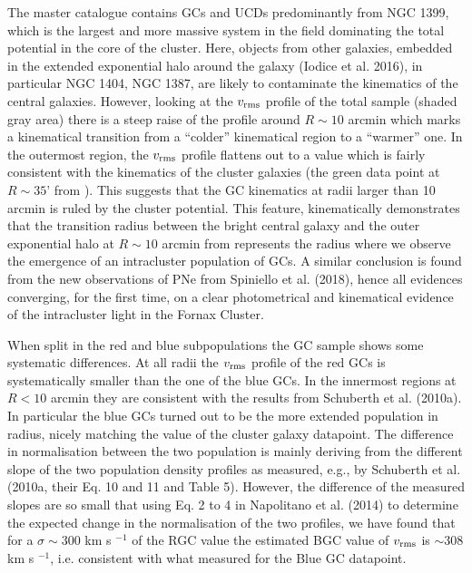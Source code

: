 \documentclass[useAMS,usenatbib]{mn2e}
\begin{document}
The master catalogue contains GCs and UCDs predominantly from NGC 1399, which is the largest and more massive system in the field dominating the total potential in the core of the cluster. Here, objects from other galaxies, embedded in the extended exponential halo around the galaxy (Iodice et al. 2016), in particular NGC 1404, NGC 1387, are likely to contaminate the kinematics of the central galaxies. However, looking at the $v_{\rm rms}$ profile of the total sample (shaded gray area) there is a steep raise of the profile around $R\sim10$ arcmin which marks a kinematical transition from a ``colder'' kinematical region to a ``warmer'' one. In the outermost region, the $v_{\rm rms}$ profile flattens out to a value which is fairly consistent with the kinematics of the cluster galaxies (the green data point at $R\sim35’$ from \citealt{Drinkwater00}). This suggests that the GC kinematics at radii larger than 10 arcmin is ruled by the cluster potential. This feature, kinematically demonstrates that the transition radius between the bright central galaxy and the outer exponential halo at $R\sim10$ arcmin from \citet{Iodice16} represents the radius where we observe the emergence of an intracluster population of GCs. A similar conclusion is found from the new observations of PNe from Spiniello et al. (2018), hence all evidences converging, for the first time, on a clear photometrical and kinematical evidence of the intracluster light in the Fornax Cluster.

When split in the red and blue subpopulations the GC sample shows some systematic differences. At all radii the $v_{\rm rms}$ profile of the red GCs is systematically smaller than the one of the blue GCs.  In the innermost regions at $R < 10$ arcmin they are consistent with the results from Schuberth et al. (2010a). In particular the blue GCs turned out to be the more extended population in radius, nicely matching the value of the cluster galaxy datapoint. The difference in normalisation between the two population is mainly deriving from the different slope of the two population density profiles as measured, e.g., by Schuberth et al. (2010a, their Eq. 10 and 11 and Table 5). However, the difference of the measured slopes are so small that using Eq. 2 to 4 in Napolitano et al. (2014) to determine the expected change in the normalisation of the two profiles, we have found that for a $\sigma \sim 300$ km s $^{-1}$ of the RGC value the estimated BGC value of $v_{\rm rms}$ is $\sim 308$ km s $^{-1}$, i.e. consistent with what measured for the Blue GC datapoint.
\end{document}
